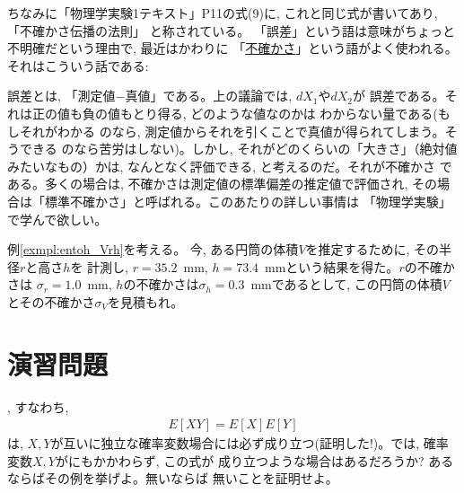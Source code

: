 ちなみに「物理学実験1テキスト」P11の式(9)に, これと同じ式が書いてあり, 
「不確かさ伝播の法則」
と称されている。
「誤差」という語は意味がちょっと不明確だという理由で, 最近はかわりに
「\underline{不確かさ}」という語がよく使われる。それはこういう話である:

誤差とは, 「測定値$-$真値」である。上の議論では, $dX_1$や$dX_2$が
誤差である。それは正の値も負の値もとり得る, どのような値なのかは
わからない量である(もしそれがわかる
のなら, 測定値からそれを引くことで真値が得られてしまう。そうできる
のなら苦労はしない)。しかし, それがどのくらいの「大きさ」（絶対値
みたいなもの）かは, なんとなく評価できる, と考えるのだ。それが不確かさ
である。多くの場合は, 不確かさは測定値の標準偏差の推定値で評価され, 
その場合は「標準不確かさ」と呼ばれる。このあたりの詳しい事情は
「物理学実験」で学んで欲しい。\\

\begin{q}\label{q:gosadempa04} 例\ref{exmpl:entoh_Vrh}を考える。
今, ある円筒の体積$V$を推定するために, その半径$r$と高さ$h$を
計測し, $r=35.2$~mm, $h=73.4$~mmという結果を得た。$r$の不確かさは
$\sigma_r=1.0$~mm, $h$の不確かさは$\sigma_h=0.3$~mmであるとして, 
この円筒の体積$V$とその不確かさ$\sigma_V$を見積もれ。\end{q}


\section*{演習問題}

\begin{exq}\label{exq:exp_XY_dep} , すなわち, 
\begin{eqnarray*}E[XY]=E[X]E[Y]\end{eqnarray*}
は, $X, Y$が互いに独立な確率変数場合には必ず成り立つ(証明した!)。では, 
確率変数$X, Y$がにもかかわらず, この式が
成り立つような場合はあるだろうか? あるならばその例を挙げよ。無いならば
無いことを証明せよ。\end{exq}



